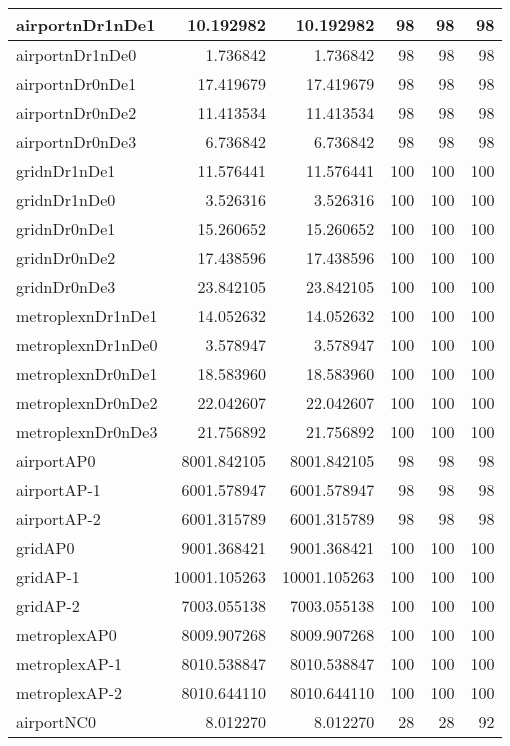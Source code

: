 \begin{longtable}{|l|r|r|r|r|r|}
\endlastfoot
airportnDr1nDe1 & 10.192982 & 10.192982 & 98 & 98 & 98 \\ \hline
airportnDr1nDe0 & 1.736842 & 1.736842 & 98 & 98 & 98 \\ \hline
airportnDr0nDe1 & 17.419679 & 17.419679 & 98 & 98 & 98 \\ \hline
airportnDr0nDe2 & 11.413534 & 11.413534 & 98 & 98 & 98 \\ \hline
airportnDr0nDe3 & 6.736842 & 6.736842 & 98 & 98 & 98 \\ \hline
gridnDr1nDe1 & 11.576441 & 11.576441 & 100 & 100 & 100 \\ \hline
gridnDr1nDe0 & 3.526316 & 3.526316 & 100 & 100 & 100 \\ \hline
gridnDr0nDe1 & 15.260652 & 15.260652 & 100 & 100 & 100 \\ \hline
gridnDr0nDe2 & 17.438596 & 17.438596 & 100 & 100 & 100 \\ \hline
gridnDr0nDe3 & 23.842105 & 23.842105 & 100 & 100 & 100 \\ \hline
metroplexnDr1nDe1 & 14.052632 & 14.052632 & 100 & 100 & 100 \\ \hline
metroplexnDr1nDe0 & 3.578947 & 3.578947 & 100 & 100 & 100 \\ \hline
metroplexnDr0nDe1 & 18.583960 & 18.583960 & 100 & 100 & 100 \\ \hline
metroplexnDr0nDe2 & 22.042607 & 22.042607 & 100 & 100 & 100 \\ \hline
metroplexnDr0nDe3 & 21.756892 & 21.756892 & 100 & 100 & 100 \\ \hline
airportAP0 & 8001.842105 & 8001.842105 & 98 & 98 & 98 \\ \hline
airportAP-1 & 6001.578947 & 6001.578947 & 98 & 98 & 98 \\ \hline
airportAP-2 & 6001.315789 & 6001.315789 & 98 & 98 & 98 \\ \hline
gridAP0 & 9001.368421 & 9001.368421 & 100 & 100 & 100 \\ \hline
gridAP-1 & 10001.105263 & 10001.105263 & 100 & 100 & 100 \\ \hline
gridAP-2 & 7003.055138 & 7003.055138 & 100 & 100 & 100 \\ \hline
metroplexAP0 & 8009.907268 & 8009.907268 & 100 & 100 & 100 \\ \hline
metroplexAP-1 & 8010.538847 & 8010.538847 & 100 & 100 & 100 \\ \hline
metroplexAP-2 & 8010.644110 & 8010.644110 & 100 & 100 & 100 \\ \hline
airportNC0 & 8.012270 & 8.012270 & 28 & 28 & 92 \\ \hline

\end{longtable}
